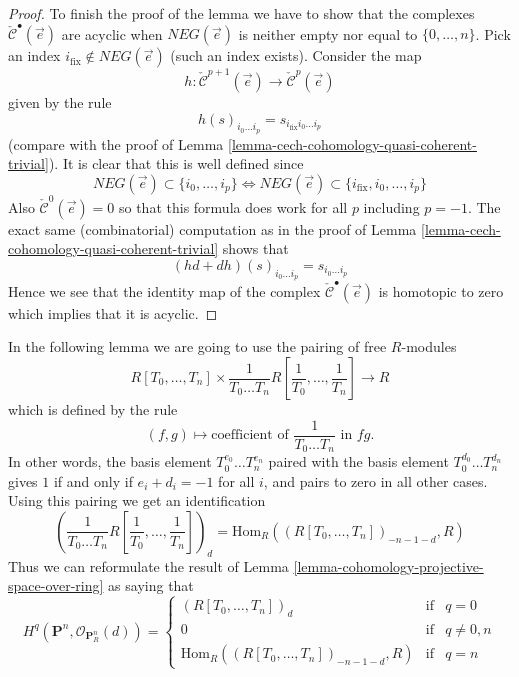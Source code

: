 \begin{proof}
\medskip\noindent
To finish the proof of the lemma we have to show that the complexes
$\check{\mathcal{C}}^\bullet(\vec{e})$ are acyclic when
$NEG(\vec{e})$ is neither empty nor equal to $\{0, \ldots, n\}$.
Pick an index $i_{\text{fix}} \not \in NEG(\vec{e})$ (such an index exists).
Consider the map
$$
h :
\check{\mathcal{C}}^{p + 1}(\vec{e})
\to
\check{\mathcal{C}}^p(\vec{e})
$$
given by the rule
$$
h(s)_{i_0 \ldots i_p} = s_{i_{\text{fix}} i_0 \ldots i_p}
$$
(compare with the proof of
Lemma \ref{lemma-cech-cohomology-quasi-coherent-trivial}).
It is clear that this is well defined since
$$
NEG(\vec{e}) \subset \{i_0, \ldots, i_p\}
\Leftrightarrow
NEG(\vec{e}) \subset \{i_{\text{fix}}, i_0, \ldots, i_p\}
$$
Also $\check{\mathcal{C}}^0(\vec{e}) = 0$ so that this
formula does work for all $p$ including $p = - 1$.
The exact same (combinatorial) computation as in the
proof of Lemma \ref{lemma-cech-cohomology-quasi-coherent-trivial}
shows that
$$
(hd + dh)(s)_{i_0 \ldots i_p}
=
s_{i_0 \ldots i_p}
$$
Hence we see that the identity map of the complex
$\check{\mathcal{C}}^\bullet(\vec{e})$ is homotopic to zero
which implies that it is acyclic.
\end{proof}

\noindent
In the following lemma we are going to use the pairing of free
$R$-modules
$$
R[T_0, \ldots, T_n]
\times
\frac{1}{T_0 \ldots T_n} R[\frac{1}{T_0}, \ldots, \frac{1}{T_n}]
\longrightarrow
R
$$
which is defined by the rule
$$
(f, g)
\longmapsto
\text{coefficient of }
\frac{1}{T_0 \ldots T_n}
\text{ in }fg.
$$
In other words, the basis element $T_0^{e_0} \ldots T_n^{e_n}$ paired
with the basis element $T_0^{d_0} \ldots T_n^{d_n}$ gives $1$ if and only
if $e_i + d_i = -1$ for all $i$, and pairs to zero in all other cases.
Using this pairing we get an identification
$$
\left(\frac{1}{T_0 \ldots T_n} R[\frac{1}{T_0}, \ldots, \frac{1}{T_n}]\right)_d
=
\text{Hom}_R((R[T_0, \ldots, T_n])_{-n - 1 - d}, R)
$$
Thus we can reformulate the result of
Lemma \ref{lemma-cohomology-projective-space-over-ring} as saying that
\begin{equation}
\label{equation-identify}
H^q(\mathbf{P}^n, \mathcal{O}_{\mathbf{P}^n_R}(d)) =
\left\{
\begin{matrix}
(R[T_0, \ldots, T_n])_d & \text{if} & q = 0 \\
0 & \text{if} & q \not = 0, n \\
\text{Hom}_R((R[T_0, \ldots, T_n])_{-n - 1 - d}, R)
& \text{if} & q = n
\end{matrix}
\right.
\end{equation}

